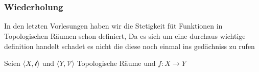 \chapter{}

\subsection{Wiederholung}
In den letzten Vorlesungen haben wir die Stetigkeit
füt Funktionen in Topologischen Räumen schon definiert,
Da es sich um eine durchaus wichtige definition handelt
schadet es nicht die diese noch einmal ins gedächniss 
zu rufen

{
    Seien $\langle X, \mathcal{t} \rangle$ und 
    $\langle Y, \mathcal{V}\rangle$
    Topologische Räume und $f : X \to Y$
}